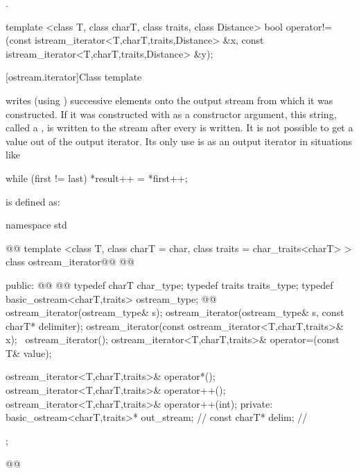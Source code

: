 \begin{itemdescr}
\pnum
\returns
{}.%
\end{itemdescr}

%
%
\begin{itemdecl}
template <class T, class charT, class traits, class Distance>
  bool operator!=(const istream_iterator<T,charT,traits,Distance> &x,
                  const istream_iterator<T,charT,traits,Distance> &y);
\end{itemdecl}

%
\begin{itemdescr}
\pnum
\returns
{}
\end{itemdescr}

[ostream.iterator]{Class template }

\pnum
{}%
writes (using
)
successive elements onto the output stream from which it was constructed.
If it was constructed with
as a constructor argument, this string, called a
,
is written to the stream after every
is written.
It is not possible to get a value out of the output iterator.
Its only use is as an output iterator in situations like

\begin{codeblock}
while (first != last)
  *result++ = *first++;
\end{codeblock}

\pnum
{}
is defined as:

\begin{codeblock}
namespace std { @@
  template <class T, class charT = char, class traits = char_traits<charT> >
  class ostream_iterator@\removed{:}@
    @@ {
  public:
    @@
    @@
    typedef charT char_type;
    typedef traits traits_type;
    typedef basic_ostream<charT,traits> ostream_type;
    @@
    ostream_iterator(ostream_type& s);
    ostream_iterator(ostream_type& s, const charT* delimiter);
    ostream_iterator(const ostream_iterator<T,charT,traits>& x);
   ~ostream_iterator();
    ostream_iterator<T,charT,traits>& operator=(const T& value);

    ostream_iterator<T,charT,traits>& operator*();
    ostream_iterator<T,charT,traits>& operator++();
    ostream_iterator<T,charT,traits>& operator++(int);
  private:
    basic_ostream<charT,traits>* out_stream;  // \expos
    const charT* delim;                       // \expos
  };
}@\newtxt{\}\}}@
\end{codeblock}

